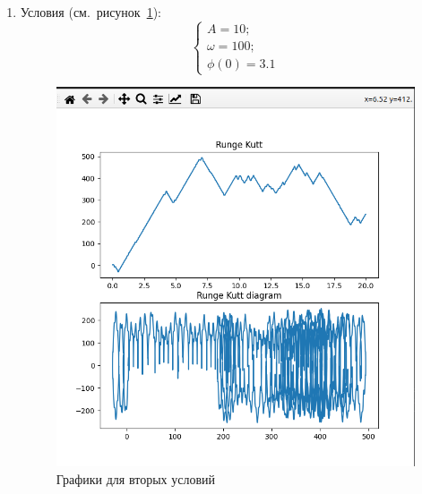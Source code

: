 \documentclass[a4paper,12pt]{article}
\begin{document}
\begin{enumerate}
		\item Условия (см.~рисунок~\ref{fig:2_praq}):
		\begin{equation}
			\begin{cases}
				A = 10; \\
				\omega = 100; \\
				\phi(0) = 3.1
			\end{cases}
		\end{equation}
		\begin{figure}[ht!]
			\begin{center}
			\includegraphics[scale=0.3]{sources/2_praq.png}
			\end{center}
			\vspace*{-8mm}
			\caption{Графики для вторых условий}\label{fig:2_praq}
	  	\end{figure}


\end{enumerate}
\end{document}
